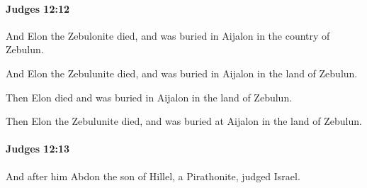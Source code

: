 		\paragraph{Judges 12:12} %
			\label{JUDGES-12-12}

			And Elon the Zebulonite died, and was buried in Aijalon in the country of Zebulun.

			\begin{versebox}
					\item[BHS] 
					\item[ASV] And Elon the Zebulunite died, and was buried in Aijalon in the land of Zebulun.
					\item[NIV] Then Elon died and was buried in Aijalon in the land of Zebulun.
					\item[NRSV] Then Elon the Zebulunite died, and was buried at Aijalon in the land of Zebulun.
			\end{versebox}

		\paragraph{Judges 12:13} %
			\label{JUDGES-12-13}

			And after him Abdon the son of Hillel, a Pirathonite, judged Israel.

